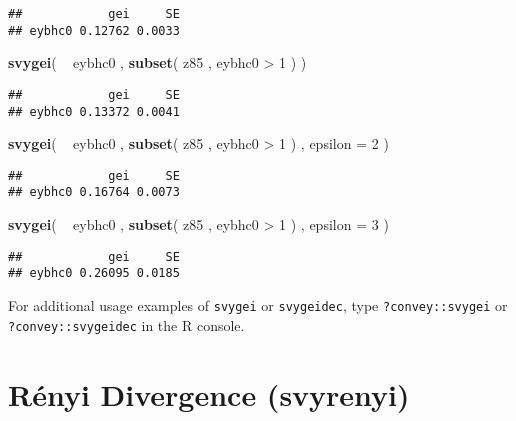\documentclass[]{book}
\newenvironment{Shaded}{\begin{snugshade}}{\end{snugshade}}
\newcommand{\KeywordTok}[1]{\textcolor[rgb]{0.13,0.29,0.53}{\textbf{{#1}}}}
\newcommand{\DataTypeTok}[1]{\textcolor[rgb]{0.13,0.29,0.53}{{#1}}}
\newcommand{\DecValTok}[1]{\textcolor[rgb]{0.00,0.00,0.81}{{#1}}}
\newcommand{\StringTok}[1]{\textcolor[rgb]{0.31,0.60,0.02}{{#1}}}
\newcommand{\NormalTok}[1]{{#1}}
\begin{document}
\begin{verbatim}
##            gei     SE
## eybhc0 0.12762 0.0033
\end{verbatim}

\begin{Shaded}
\begin{Highlighting}[]
\KeywordTok{svygei}\NormalTok{( ~}\StringTok{ }\NormalTok{eybhc0 , }\KeywordTok{subset}\NormalTok{( z85 , eybhc0 >}\StringTok{ }\DecValTok{1} \NormalTok{) )}
\end{Highlighting}
\end{Shaded}

\begin{verbatim}
##            gei     SE
## eybhc0 0.13372 0.0041
\end{verbatim}

\begin{Shaded}
\begin{Highlighting}[]
\KeywordTok{svygei}\NormalTok{( ~}\StringTok{ }\NormalTok{eybhc0 , }\KeywordTok{subset}\NormalTok{( z85 , eybhc0 >}\StringTok{ }\DecValTok{1} \NormalTok{) , }\DataTypeTok{epsilon =} \DecValTok{2} \NormalTok{)}
\end{Highlighting}
\end{Shaded}

\begin{verbatim}
##            gei     SE
## eybhc0 0.16764 0.0073
\end{verbatim}

\begin{Shaded}
\begin{Highlighting}[]
\KeywordTok{svygei}\NormalTok{( ~}\StringTok{ }\NormalTok{eybhc0 , }\KeywordTok{subset}\NormalTok{( z85 , eybhc0 >}\StringTok{ }\DecValTok{1} \NormalTok{) , }\DataTypeTok{epsilon =} \DecValTok{3} \NormalTok{)}
\end{Highlighting}
\end{Shaded}

\begin{verbatim}
##            gei     SE
## eybhc0 0.26095 0.0185
\end{verbatim}

For additional usage examples of \texttt{svygei} or \texttt{svygeidec},
type \texttt{?convey::svygei} or \texttt{?convey::svygeidec} in the R
console.

\section{Rényi Divergence (svyrenyi)}\label{renyi-divergence-svyrenyi}
\end{document}
